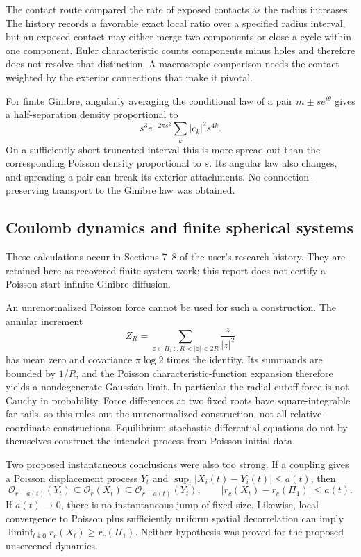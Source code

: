 \documentclass[11pt,a4paper]{article}
\theoremstyle{definition}
\theoremstyle{remark}
\numberwithin{equation}{section}
\begin{document}
The contact route compared the rate of exposed contacts as the radius
increases.  The history records a favorable exact local ratio over a
specified radius interval, but an exposed contact may either merge two
components or close a cycle within one component.  Euler characteristic
counts components minus holes and therefore does not resolve that
distinction.  A macroscopic comparison needs the contact weighted by
the exterior connections that make it pivotal.

For finite Ginibre, angularly averaging the conditional law of a pair
$m\pm se^{i\theta}$ gives a half-separation density proportional to
\[
 s^3e^{-2\pi s^2}\sum_k|c_k|^2s^{4k}.
\]
On a sufficiently short truncated interval this is more spread out than
the corresponding Poisson density proportional to $s$.  Its angular law
also changes, and spreading a pair can break its exterior attachments.
No connection-preserving transport to the Ginibre law was obtained.

\subsection{Coulomb dynamics and finite spherical systems}
\label{br:dynamics}

These calculations occur in Sections 7--8 of the user's research
history.  They are retained here as recovered finite-system work; this
report does not certify a Poisson-start infinite Ginibre diffusion.

An unrenormalized Poisson force cannot be used for such a construction.
The annular increment
\[
 Z_R=\sum_{z\in\Pi_1\,:,R<|z|<2R}\frac{z}{|z|^2}
\]
has mean zero and covariance $\pi\log2$ times the identity.  Its summands
are bounded by $1/R$, and the Poisson characteristic-function expansion
therefore yields a nondegenerate Gaussian limit.  In particular the
radial cutoff force is not Cauchy in probability.  Force differences at
two fixed roots have square-integrable far tails, so this rules out the
unrenormalized construction, not all relative-coordinate constructions.
Equilibrium stochastic differential equations do not by themselves
construct the intended process from Poisson initial data.

Two proposed instantaneous conclusions were also too strong.  If a
coupling gives a Poisson displacement process $Y_t$ and
$\sup_i|X_i(t)-Y_i(t)|\leq a(t)$, then
\[
 \mathcal O_{r-a(t)}(Y_t)\subseteq\mathcal O_r(X_t)
 \subseteq\mathcal O_{r+a(t)}(Y_t),
 \qquad |r_c(X_t)-r_c(\Pi_1)|\leq a(t).
\]
If $a(t)\to0$, there is no instantaneous jump of fixed size.  Likewise,
local convergence to Poisson plus sufficiently uniform spatial
decorrelation can imply $\liminf_{t\downarrow0}r_c(X_t)\geq r_c(\Pi_1)$.
Neither hypothesis was proved for the proposed unscreened dynamics.
\end{document}
